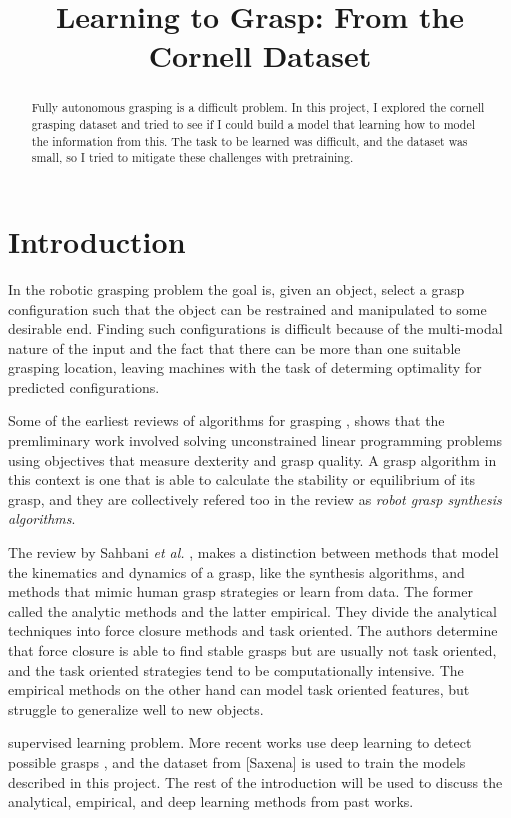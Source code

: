 \documentclass{article}
\title{Learning to Grasp: From the Cornell Dataset}
\begin{document}
\maketitle

\begin{abstract}
Fully autonomous grasping is a difficult problem. In this project, I explored
the cornell grasping dataset and tried to see if I could build a model that
learning how to model the information from this. The task to be learned was
difficult, and the dataset was small, so I tried to mitigate these challenges
with pretraining.
\end{abstract}

\section{Introduction}
In the robotic grasping problem the goal is, given an object, select a grasp
configuration such that the object can be restrained and
manipulated to some desirable end. Finding such configurations is difficult
because of the multi-modal nature of the input and the fact that there can be
more than one suitable grasping location, leaving machines with the task
of determing optimality for predicted configurations.

Some of the earliest reviews of algorithms for grasping \cite{shimoga96,bicchi00},
shows that the premliminary work involved solving unconstrained linear programming
problems using objectives that measure dexterity and grasp quality. A grasp
algorithm in this context is one that is able to calculate the stability or
equilibrium of its grasp, and they are collectively refered too in the
review as \textit{robot grasp synthesis algorithms}.

The review by Sahbani \textit{et al.} \cite{sahbani12}, makes a distinction
between methods that model the kinematics and dynamics of a grasp, like the
synthesis algorithms, and methods that mimic human grasp strategies or learn
from data. The former called the analytic methods and the latter empirical.
They divide the analytical techniques into force closure methods and task
oriented. The authors determine that force closure is able to find stable
grasps but are usually not task oriented, and the task oriented strategies tend
to be computationally intensive. The empirical methods on the other hand can
model task oriented features, but struggle to generalize well to new objects.

supervised learning problem. More recent works use deep learning to detect
possible grasps \cite{lenz15,zhang18,zhou18}, and the dataset from [Saxena]
is used to train the models described in this project. The rest of the
introduction will be used to discuss the analytical, empirical, and deep learning
methods from past works.
\end{document}
